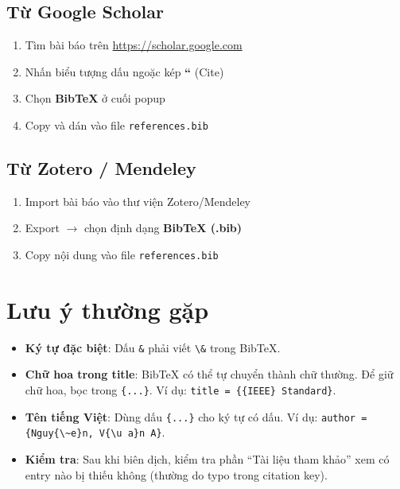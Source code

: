 \subsection{Từ Google Scholar}

\begin{enumerate}
  \item Tìm bài báo trên \url{https://scholar.google.com}
  \item Nhấn biểu tượng dấu ngoặc kép \textbf{``} (Cite)
  \item Chọn \textbf{BibTeX} ở cuối popup
  \item Copy và dán vào file \texttt{references.bib}
\end{enumerate}

\subsection{Từ Zotero / Mendeley}

\begin{enumerate}
  \item Import bài báo vào thư viện Zotero/Mendeley
  \item Export $\rightarrow$ chọn định dạng \textbf{BibTeX (.bib)}
  \item Copy nội dung vào file \texttt{references.bib}
\end{enumerate}

\section{Lưu ý thường gặp}

\begin{itemize}
  \item \textbf{Ký tự đặc biệt}: Dấu \texttt{\&} phải viết \verb|\&| trong BibTeX.
  \item \textbf{Chữ hoa trong title}: BibTeX có thể tự chuyển thành chữ thường. Để giữ chữ hoa, bọc trong \verb|{...}|. Ví dụ: \verb|title = {{IEEE} Standard}|.
  \item \textbf{Tên tiếng Việt}: Dùng dấu \verb|{...}| cho ký tự có dấu. Ví dụ: \verb|author = {Nguy{\~e}n, V{\u a}n A}|.
  \item \textbf{Kiểm tra}: Sau khi biên dịch, kiểm tra phần ``Tài liệu tham khảo'' xem có entry nào bị thiếu không (thường do typo trong citation key).
\end{itemize}
